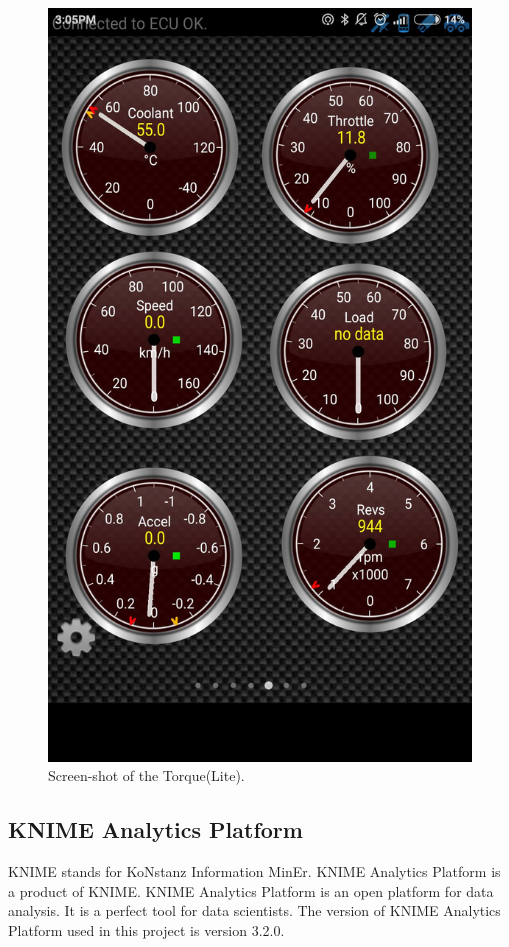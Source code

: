 \begin{figure}[hbt!]\centering
\includegraphics[height=.5\textheight]{image/torque}
\caption{Screen-shot of the Torque(Lite).}
\label{fig:torque}
\end{figure}

\subsection{KNIME Analytics Platform}
KNIME stands for KoNstanz Information MinEr. KNIME Analytics Platform is a product of KNIME.
KNIME Analytics Platform is an open platform for data analysis. It is a perfect tool for data scientists. The version of KNIME Analytics Platform used in this project is version 3.2.0. 

